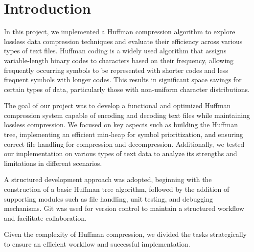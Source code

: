 \documentclass[12pt,oneside,letterpaper,english]{article}
\title{} %
\begin{document}


\newpage
\doublespacing
\renewcommand{\baselinestretch}{1}\normalsize
\tableofcontents
\renewcommand{\baselinestretch}{1}\normalsize
\thispagestyle{fancy} %

\newpage
{} 
\section{Introduction}
In this project, we implemented a Huffman compression algorithm to explore lossless data compression techniques and evaluate their efficiency across various types of text files. Huffman coding is a widely used algorithm that assigns variable-length binary codes to characters based on their frequency, allowing frequently occurring symbols to be represented with shorter codes and less frequent symbols with longer codes. This results in significant space savings for certain types of data, particularly those with non-uniform character distributions.

The goal of our project was to develop a functional and optimized Huffman compression system capable of encoding and decoding text files while maintaining lossless compression. We focused on key aspects such as building the Huffman tree, implementing an efficient min-heap for symbol prioritization, and ensuring correct file handling for compression and decompression. Additionally, we tested our implementation on various types of text data to analyze its strengths and limitations in different scenarios.

A structured development approach was adopted, beginning with the construction of a basic Huffman tree algorithm, followed by the addition of supporting modules such as file handling, unit testing, and debugging mechanisms. Git was used for version control to maintain a structured workflow and facilitate collaboration.



Given the complexity of Huffman compression, we divided the tasks strategically to ensure an efficient workflow and successful implementation.
\end{document}

